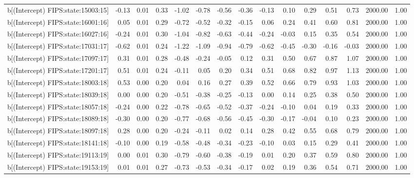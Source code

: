 \begin{table}[ht]
\begin{tabular}{rrrrrrrrrrrrrrr}
  b[(Intercept) FIPS:state:15003:15] & -0.13 & 0.01 & 0.33 & -1.02 & -0.78 & -0.56 & -0.36 & -0.13 & 0.10 & 0.29 & 0.51 & 0.73 & 2000.00 & 1.00 \\ 
  b[(Intercept) FIPS:state:16001:16] & 0.05 & 0.01 & 0.29 & -0.72 & -0.52 & -0.32 & -0.15 & 0.06 & 0.24 & 0.41 & 0.60 & 0.81 & 2000.00 & 1.00 \\ 
  b[(Intercept) FIPS:state:16027:16] & -0.24 & 0.01 & 0.30 & -1.04 & -0.82 & -0.63 & -0.44 & -0.24 & -0.03 & 0.15 & 0.35 & 0.54 & 2000.00 & 1.00 \\ 
  b[(Intercept) FIPS:state:17031:17] & -0.62 & 0.01 & 0.24 & -1.22 & -1.09 & -0.94 & -0.79 & -0.62 & -0.45 & -0.30 & -0.16 & -0.03 & 2000.00 & 1.00 \\ 
  b[(Intercept) FIPS:state:17097:17] & 0.31 & 0.01 & 0.28 & -0.48 & -0.24 & -0.05 & 0.12 & 0.31 & 0.50 & 0.67 & 0.87 & 1.07 & 2000.00 & 1.00 \\ 
  b[(Intercept) FIPS:state:17201:17] & 0.51 & 0.01 & 0.24 & -0.11 & 0.05 & 0.20 & 0.34 & 0.51 & 0.68 & 0.82 & 0.97 & 1.13 & 2000.00 & 1.00 \\ 
  b[(Intercept) FIPS:state:18003:18] & 0.53 & 0.00 & 0.20 & 0.04 & 0.16 & 0.27 & 0.39 & 0.52 & 0.66 & 0.79 & 0.93 & 1.03 & 2000.00 & 1.00 \\ 
  b[(Intercept) FIPS:state:18039:18] & 0.00 & 0.00 & 0.20 & -0.51 & -0.38 & -0.25 & -0.13 & 0.00 & 0.14 & 0.25 & 0.38 & 0.50 & 2000.00 & 1.00 \\ 
  b[(Intercept) FIPS:state:18057:18] & -0.24 & 0.00 & 0.22 & -0.78 & -0.65 & -0.52 & -0.37 & -0.24 & -0.10 & 0.04 & 0.19 & 0.33 & 2000.00 & 1.00 \\ 
  b[(Intercept) FIPS:state:18089:18] & -0.30 & 0.00 & 0.20 & -0.77 & -0.68 & -0.56 & -0.45 & -0.30 & -0.17 & -0.04 & 0.10 & 0.23 & 2000.00 & 1.00 \\ 
  b[(Intercept) FIPS:state:18097:18] & 0.28 & 0.00 & 0.20 & -0.24 & -0.11 & 0.02 & 0.14 & 0.28 & 0.42 & 0.55 & 0.68 & 0.79 & 2000.00 & 1.00 \\ 
  b[(Intercept) FIPS:state:18141:18] & -0.10 & 0.00 & 0.19 & -0.58 & -0.48 & -0.34 & -0.23 & -0.10 & 0.03 & 0.15 & 0.29 & 0.41 & 2000.00 & 1.00 \\ 
  b[(Intercept) FIPS:state:19113:19] & 0.00 & 0.01 & 0.30 & -0.79 & -0.60 & -0.38 & -0.19 & 0.01 & 0.20 & 0.37 & 0.59 & 0.80 & 2000.00 & 1.00 \\ 
  b[(Intercept) FIPS:state:19153:19] & 0.01 & 0.01 & 0.27 & -0.73 & -0.53 & -0.34 & -0.17 & 0.02 & 0.19 & 0.36 & 0.54 & 0.71 & 2000.00 & 1.00 \\ 

\end{tabular}
\end{table}

